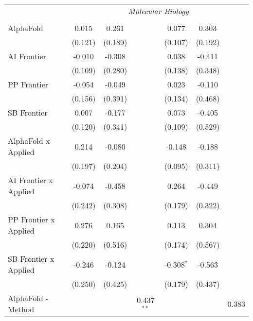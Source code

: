 \begin{tabular}{lcccccc}
 & \multicolumn{6}{c}{\textit{Molecular Biology}} \\ \\
   AlphaFold                      & 0.015   & 0.261   &               & 0.077        & 0.303   &   \\   
                                  & (0.121) & (0.189) &               & (0.107)      & (0.192) &   \\   
   AI Frontier                    & -0.010  & -0.308  &               & 0.038        & -0.411  &   \\   
                                  & (0.109) & (0.280) &               & (0.138)      & (0.348) &   \\   
   PP Frontier                    & -0.054  & -0.049  &               & 0.023        & -0.110  &   \\   
                                  & (0.156) & (0.391) &               & (0.134)      & (0.468) &   \\   
   SB Frontier                    & 0.007   & -0.177  &               & 0.073        & -0.405  &   \\   
                                  & (0.120) & (0.341) &               & (0.109)      & (0.529) &   \\   
   AlphaFold x Applied            & 0.214   & -0.080  &               & -0.148       & -0.188  &   \\   
                                  & (0.197) & (0.204) &               & (0.095)      & (0.311) &   \\   
   AI Frontier x Applied          & -0.074  & -0.458  &               & 0.264        & -0.449  &   \\   
                                  & (0.242) & (0.308) &               & (0.179)      & (0.322) &   \\   
   PP Frontier x Applied          & 0.276   & 0.165   &               & 0.113        & 0.304   &   \\   
                                  & (0.220) & (0.516) &               & (0.174)      & (0.567) &   \\   
   SB Frontier x Applied          & -0.246  & -0.124  &               & -0.308$^{*}$ & -0.563  &   \\   
                                  & (0.250) & (0.425) &               & (0.179)      & (0.437) &   \\   
   AlphaFold - Method             &         &         & 0.437$^{**}$  &              &         & 0.383\\   

\end{tabular}
